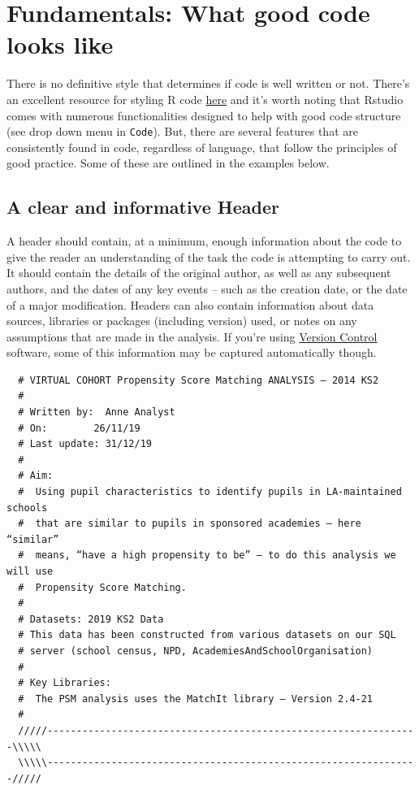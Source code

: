 \documentclass[
]{book}
\begin{document}
\hypertarget{good}{%
\chapter{Fundamentals: What good code looks like}\label{good}}

There is no definitive style that determines if code is well written or not. There's an excellent resource for styling R code \href{https://style.tidyverse.org/index.html}{here} and it's worth noting that Rstudio comes with numerous functionalities designed to help with good code structure (see drop down menu in \texttt{Code}). But, there are several features that are consistently found in code, regardless of language, that follow the principles of good practice. Some of these are outlined in the examples below.

\hypertarget{a-clear-and-informative-header}{%
\section{A clear and informative Header}\label{a-clear-and-informative-header}}

A header should contain, at a minimum, enough information about the code to give the reader an understanding of the task the code is attempting to carry out. It should contain the details of the original author, as well as any subsequent authors, and the dates of any key events -- such as the creation date, or the date of a major modification. Headers can also contain information about data sources, libraries or packages (including version) used, or notes on any assumptions that are made in the analysis. If you're using \protect\hyperlink{VC}{Version Control} software, some of this information may be captured automatically though.

\begin{verbatim}
  # VIRTUAL COHORT Propensity Score Matching ANALYSIS – 2014 KS2    
  #
  # Written by:  Anne Analyst
  # On:        26/11/19
  # Last update: 31/12/19
  #
  # Aim:
  #  Using pupil characteristics to identify pupils in LA-maintained schools 
  #  that are similar to pupils in sponsored academies – here “similar” 
  #  means, “have a high propensity to be” – to do this analysis we will use
  #  Propensity Score Matching.
  #
  # Datasets: 2019 KS2 Data
  # This data has been constructed from various datasets on our SQL
  # server (school census, NPD, AcademiesAndSchoolOrganisation)
  #
  # Key Libraries:
  #  The PSM analysis uses the MatchIt library – Version 2.4-21
  #
  /////----------------------------------------------------------------\\\\\
  \\\\\----------------------------------------------------------------/////
\end{verbatim}
\end{document}
